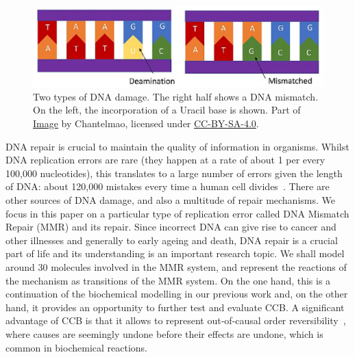 \documentclass[review]{elsarticle}
\newcommand{\Red}[1]{\textcolor{red}{#1}}
\begin{document}
\begin{figure}[h!]
  \centering
    \includegraphics[width=1.0\textwidth]{Types_of_DNA_Damage_part}
  \caption[Two types of DNA damage.]{Two types of DNA damage. The right half shows a DNA mismatch.
  On the left, the incorporation of a Uracil base is shown.
  Part of \href{https://commons.wikimedia.org/wiki/File:Types_of_DNA_Damage.jpg}{Image} by Chantelmao, licensed under \href{https://creativecommons.org/licenses/by-sa/4.0/deed.en}{CC-BY-SA-4.0}.}
  \label{fig:damages}
\end{figure}

DNA repair is crucial to maintain the quality of information in organisms. Whilst DNA replication errors are rare (they happen at a rate of about 1 per every 100,000 nucleotides), this translates to a large number of errors given the length of DNA: about 120,000 mistakes every time a human cell divides~\cite{damage}. There are other sources of DNA damage, and also a multitude of repair mechanisms. We focus in this paper on a particular type of replication error called DNA Mismatch Repair (MMR) and its repair. Since incorrect DNA can give rise to cancer and other illnesses and generally to early ageing and death, DNA repair is a crucial part of life and its understanding is an important research topic.
%
We shall model around 30 molecules involved in the MMR system, and represent the reactions of the mechanism as transitions of the MMR system. On the one hand, this is a continuation of the biochemical modelling in our previous work and, on the other hand, it provides an opportunity to further test and evaluate CCB.  
A significant advantage of CCB is that it allows to represent out-of-causal order reversibility~\cite{Irek2012}, where causes are seemingly undone before their effects are undone, which is common in biochemical reactions.

\end{document}

